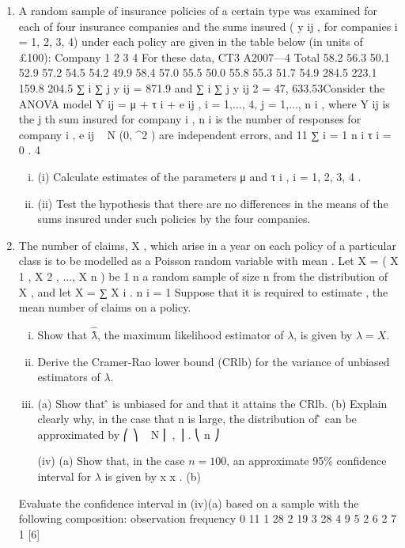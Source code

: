 \documentclass[a4paper,12pt]{article}
\begin{document}
\begin{enumerate}
\item A random sample of insurance policies of a certain type was examined for each of
four insurance companies and the sums insured ( y ij , for companies i = 1, 2, 3, 4)
under each policy are given in the table below (in units of £100):
Company
1
2
3
4
For these data,
CT3 A2007—4
Total
58.2
56.3
50.1
52.9
57.2
54.5
54.2
49.9
58.4
57.0
55.5
50.0
55.8
55.3
51.7
54.9
284.5
223.1
159.8
204.5
∑ i ∑ j y ij = 871.9 and ∑ i ∑ j y ij 2 = 47, 633.53Consider the ANOVA model Y ij = μ + τ i + e ij , i = 1,..., 4, j = 1,..., n i , where Y ij is the j th
sum insured for company i , n i is the number of responses for company i ,
e ij ~ N (0, \sigma^2 ) are independent errors, and
11
∑ i = 1 n i τ i = 0 .
4

\begin{enumerate}[(i)]
\item (i) Calculate estimates of the parameters μ and τ i , i = 1, 2, 3, 4 .
\item (ii) Test the hypothesis that there are no differences in the means of the sums
insured under such policies by the four companies.
\end{enumerate}


\item The number of claims, X , which arise in a year on each policy of a particular class is to be modelled as a Poisson random variable with mean \lambda. Let X = ( X 1 , X 2 , ..., X n ) be
1 n
a random sample of size n from the distribution of X , and let X = ∑ X i .
n i = 1
Suppose that it is required to estimate \lambda , the mean number of claims on a policy.
\begin{enumerate}[(i)]
\item Show that $\hat{\lambdâ}$, the maximum likelihood estimator of $\lambda$, is given by $\hat{\lambda} = X $. 
\item Derive the Cramer-Rao lower bound (CRlb) for the variance of unbiased estimators of $\lambda$.
\item 

(a) Show that \lambdâ is unbiased for \lambda and that it attains the CRlb.
(b) Explain clearly why, in the case that n is large, the distribution of \lambdâ can be approximated by
⎛ \lambda ⎞
\hat{\lambda} ~ N ⎜ \lambda , ⎟ .
⎝ n ⎠

(iv)
(a)
Show that, in the case $n = 100$, an approximate 95\% confidence interval for $\lambda$ is given by
x  x .
(b)
\end{enumerate}
Evaluate the confidence interval in (iv)(a) based on a sample with the
following composition:
observation
frequency
0
11
1
28
2
19
3
28
4
9
5
2
6
2
7
1
[6]



\end{enumerate}
\end{document}
